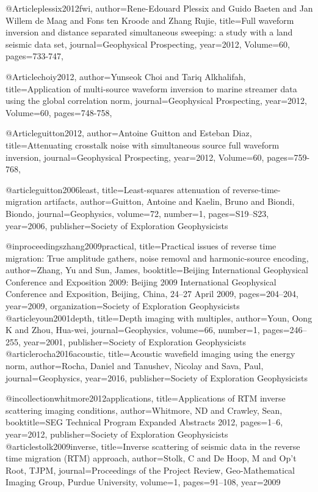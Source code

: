 @Article{plessix2012fwi,
  author={Rene-Edouard Plessix and Guido Baeten and Jan Willem de Maag and Fons ten Kroode and Zhang Rujie},
  title={Full waveform inversion and distance separated simultaneous sweeping: a study with a land seismic data set},
  journal={Geophysical Prospecting},
  year=2012,
  Volume=60,
  pages={733-747},
}

@Article{choiy2012,
  author={Yunseok Choi and Tariq Alkhalifah},
  title={Application of multi-source waveform inversion to marine streamer data using the global correlation norm},
  journal={Geophysical Prospecting},
  year=2012,
  Volume=60,
  pages={748-758},
}


@Article{guitton2012,
  author={Antoine Guitton and Esteban Diaz},
  title={Attenuating crosstalk noise with simultaneous source full waveform inversion},
  journal={Geophysical Prospecting},
  year=2012,
  Volume=60,
  pages={759-768},
}

@article{guitton2006least,
  title={Least-squares attenuation of reverse-time-migration artifacts},
  author={Guitton, Antoine and Kaelin, Bruno and Biondi, Biondo},
  journal={Geophysics},
  volume={72},
  number={1},
  pages={S19--S23},
  year={2006},
  publisher={Society of Exploration Geophysicists}
}

@inproceedings{zhang2009practical,
  title={Practical issues of reverse time migration: True amplitude gathers, noise removal and harmonic-source encoding},
  author={Zhang, Yu and Sun, James},
  booktitle={Beijing International Geophysical Conference and Exposition 2009: Beijing 2009 International Geophysical Conference and Exposition, Beijing, China, 24--27 April 2009},
  pages={204--204},
  year={2009},
  organization={Society of Exploration Geophysicists}
}
@article{youn2001depth,
  title={Depth imaging with multiples},
  author={Youn, Oong K and Zhou, Hua-wei},
  journal={Geophysics},
  volume={66},
  number={1},
  pages={246--255},
  year={2001},
  publisher={Society of Exploration Geophysicists}
}
@article{rocha2016acoustic,
  title={Acoustic wavefield imaging using the energy norm},
  author={Rocha, Daniel and Tanushev, Nicolay and Sava, Paul},
  journal={Geophysics},
  year={2016},
  publisher={Society of Exploration Geophysicists}
}

@incollection{whitmore2012applications,
  title={Applications of RTM inverse scattering imaging conditions},
  author={Whitmore, ND and Crawley, Sean},
  booktitle={SEG Technical Program Expanded Abstracts 2012},
  pages={1--6},
  year={2012},
  publisher={Society of Exploration Geophysicists}
}
@article{stolk2009inverse,
  title={Inverse scattering of seismic data in the reverse time migration (RTM) approach},
  author={Stolk, C and De Hoop, M and Op’t Root, TJPM},
  journal={Proceedings of the Project Review, Geo-Mathematical Imaging Group, Purdue University},
  volume={1},
  pages={91--108},
  year={2009}
}

